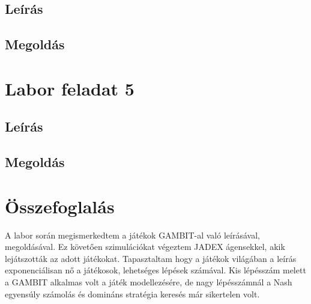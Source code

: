 \subsection{Leírás}
\subsection{Megoldás}


\section{Labor feladat 5}
\subsection{Leírás}
\subsection{Megoldás}

\section{Összefoglalás}
A labor során megismerkedtem a játékok GAMBIT-al való leírásával, megoldásával. Ez követően szimulációkat végeztem JADEX ágensekkel, akik lejátszották az adott játékokat. Tapasztaltam hogy a játékok világában a leírás exponenciálisan nő a játékosok, lehetséges lépések számával. Kis lépésszám melett a GAMBIT alkalmas volt a játék modellezésére, de nagy lépésszámnál a Nash egyensúly számolás és domináns stratégia keresés már sikertelen volt.